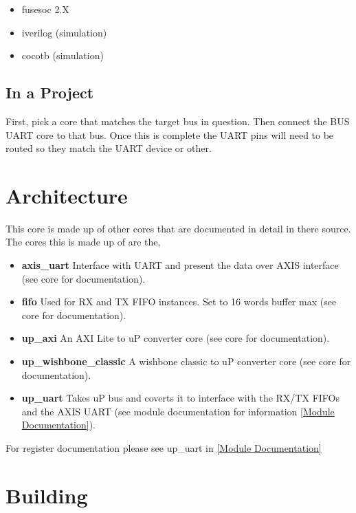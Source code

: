\begin{itemize}
  \item fusesoc 2.X
  \item iverilog (simulation)
  \item cocotb (simulation)
\end{itemize}







\subsection{In a Project}
\par
First, pick a core that matches the target bus in question. Then connect the BUS UART core to that bus. Once this is complete the UART pins will need
to be routed so they match the UART device or other.

\section{Architecture}
\par
This core is made up of other cores that are documented in detail in there source. The cores this is made up of are the,
\begin{itemize}
  \item \textbf{axis\_uart} Interface with UART and present the data over AXIS interface (see core for documentation).
  \item \textbf{fifo} Used for RX and TX FIFO instances. Set to 16 words buffer max (see core for documentation).
  \item \textbf{up\_axi} An AXI Lite to uP converter core (see core for documentation).
  \item \textbf{up\_wishbone\_classic} A wishbone classic to uP converter core (see core for documentation).
  \item \textbf{up\_uart} Takes uP bus and coverts it to interface with the RX/TX FIFOs and the AXIS UART (see module documentation for information \ref{Module Documentation}).
\end{itemize}

For register documentation please see up\_uart in \ref{Module Documentation}

\section{Building}


